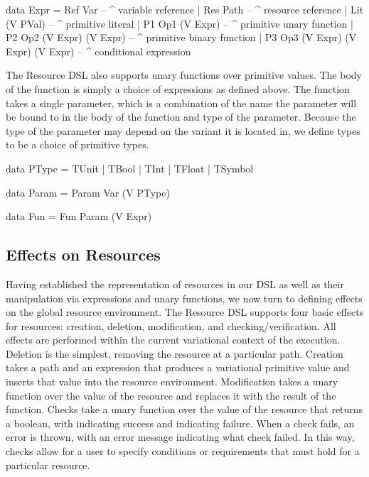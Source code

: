 \documentclass[letterpaper,10pt,onecolumn]{article}
\begin{document}
\begin{program}
data Expr
     = Ref Var                             -- ^ variable reference
     | Res Path                            -- ^ resource reference
     | Lit (V PVal)                        -- ^ primitive literal
     | P1  Op1 (V Expr)                    -- ^ primitive unary function
     | P2  Op2 (V Expr) (V Expr)           -- ^ primitive binary function
     | P3 Op3 (V Expr) (V Expr) (V Expr) -- ^ conditional expression
\end{program}

The Resource DSL also supports unary functions over primitive values. The body of the function is simply a choice of expressions as defined above.
The function takes a single parameter, which is a combination of the name the parameter will be bound to in the body of the function and type of the parameter. Because the
type of the parameter may depend on the variant it is located in, we define types to be a choice of primitive types.

\begin{program}
data PType = TUnit | TBool | TInt | TFloat | TSymbol

data Param = Param Var (V PType)

data Fun = Fun Param (V Expr)
\end{program}

\subsection{Effects on Resources}

Having established the representation of resources in our DSL as well as their manipulation via expressions and unary functions,
we now turn to defining effects on the global resource environment.
The Resource DSL supports four basic effects for resources: creation, deletion, modification, and checking/verification. All effects are performed
within the current variational context of the execution. Deletion is the
simplest, removing the resource at a particular path. Creation takes a path and an expression that produces a variational primitive value
and inserts that value into the resource environment. Modification takes a unary function over the value of the resource and replaces it
with the result of the function. Checks take a unary function over the value of the resource that returns a boolean, with  indicating
success and  indicating failure. When a check fails, an error is thrown, with an error message indicating what check failed.
In this way, checks allow for a user to specify conditions or requirements that must hold for a particular resource.
\end{document}
